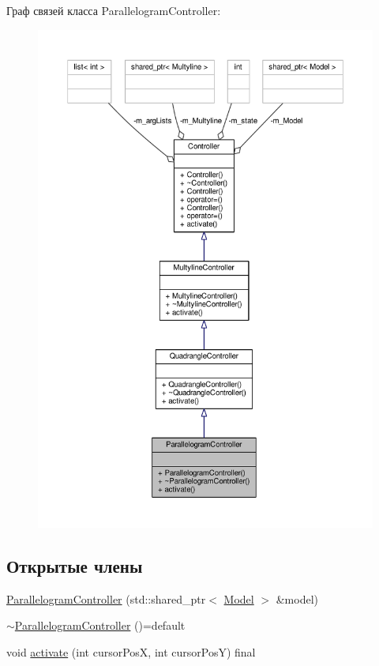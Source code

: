 Граф связей класса Parallelogram\-Controller\-:
\nopagebreak
\begin{figure}[H]
\begin{center}
\leavevmode
\includegraphics[width=350pt]{class_parallelogram_controller__coll__graph}
\end{center}
\end{figure}
\subsection*{Открытые члены}
\begin{DoxyCompactItemize}
\item 
\hyperlink{class_parallelogram_controller_a50710c8414ccc4dc61ea8feca061b72b}{Parallelogram\-Controller} (std\-::shared\-\_\-ptr$<$ \hyperlink{class_model}{Model} $>$ \&model)
\item 
\hyperlink{class_parallelogram_controller_a5db7cdfa39aed1a197640390917eb4a5}{$\sim$\-Parallelogram\-Controller} ()=default
\item 
void \hyperlink{class_parallelogram_controller_a42022d7939a32ef5fcdced235edad018}{activate} (int cursor\-Pos\-X, int cursor\-Pos\-Y) final
\end{DoxyCompactItemize}


